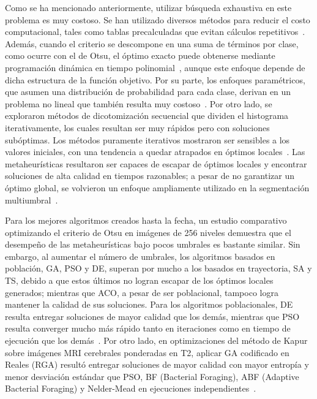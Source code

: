 \documentclass[letter, 10pt]{article}
\begin{document}
Como se ha mencionado anteriormente, utilizar b\'usqueda exhaustiva en este problema es muy costoso. Se han utilizado diversos m\'etodos para reducir el costo computacional,
tales como tablas precalculadas que evitan c\'alculos repetitivos~\cite{Liao2001Fast, Hammouche2010Comparative, Manikandan2014Multilevel}.
Adem\'as, cuando el criterio se descompone en una suma de t\'erminos por clase, como ocurre con el de Otsu, el \'optimo exacto puede obtenerse mediante programaci\'on din\'amica en tiempo polinomial~\cite{Fisher1958Grouping, Luessi2009Framework}, aunque este enfoque depende de dicha estructura de la funci\'on objetivo.
Por su parte, los enfoques param\'etricos, que asumen una distribuci\'on de probabilidad para cada clase, derivan en un problema no lineal que tambi\'en resulta muy costoso~\cite{Hammouche2010Comparative}.
Por otro lado, se exploraron m\'etodos de dicotomizaci\'on secuencial que dividen el histograma iterativamente, los cuales resultan ser muy r\'apidos pero con soluciones sub\'optimas.
Los m\'etodos puramente iterativos mostraron ser sensibles a los valores iniciales, con una tendencia a quedar atrapados en \'optimos locales~\cite{Hammouche2010Comparative}.
Las metaheur\'isticas resultaron ser capaces de escapar de \'optimos locales y encontrar soluciones de alta calidad en tiempos razonables; a pesar de no garantizar un \'optimo global,
se volvieron un enfoque ampliamente utilizado en la segmentaci\'on multiumbral~\cite{Hammouche2010Comparative, Lameesa2024Role}.

Para los mejores algoritmos creados hasta la fecha, un estudio comparativo optimizando el criterio de Otsu en im\'agenes de 256 niveles demuestra que
el desempe\~no de las metaheur\'isticas bajo pocos umbrales es bastante similar. Sin embargo, al aumentar el n\'umero de umbrales,
los algoritmos basados en poblaci\'on, GA, PSO y DE, superan por mucho a los basados en trayectoria, SA y TS,
debido a que estos \'ultimos no logran escapar de los \'optimos locales generados; mientras que ACO, a pesar de ser poblacional, tampoco logra mantener la calidad de sus soluciones.
Para los algoritmos poblacionales, DE resulta entregar soluciones de mayor calidad que los dem\'as,
mientras que PSO resulta converger mucho m\'as r\'apido tanto en iteraciones como en tiempo de ejecuci\'on que los dem\'as~\cite{Hammouche2010Comparative}.
Por otro lado, en optimizaciones del m\'etodo de Kapur sobre im\'agenes MRI cerebrales ponderadas en T2, aplicar GA codificado en Reales (RGA) result\'o entregar soluciones de mayor calidad con mayor entrop\'ia y menor desviaci\'on est\'andar que PSO, BF (Bacterial Foraging), ABF (Adaptive Bacterial Foraging) y Nelder-Mead en ejecuciones independientes~\cite{Manikandan2014Multilevel}.
\end{document}
